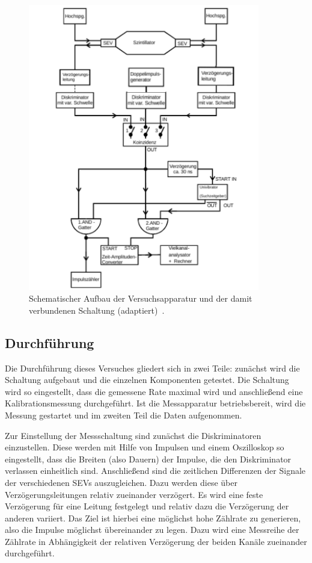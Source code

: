 \begin{figure}[htb]
  \centering
  \includegraphics[width=0.9\textwidth]{figures/versuchsaufbau_adapt.pdf}
  \caption{Schematischer Aufbau der Versuchsapparatur und der damit verbundenen Schaltung (adaptiert)~\cite{V01}.}
  \label{fig:aufbau}
\end{figure}

\subsection{Durchführung}

Die Durchführung dieses Versuches gliedert sich in zwei Teile: zunächst wird die
Schaltung aufgebaut und die einzelnen Komponenten getestet. Die Schaltung wird
so eingestellt, dass die gemessene Rate maximal wird und anschließend eine
Kalibrationsmessung durchgeführt. Ist die Messapparatur betriebsbereit, wird die
Messung gestartet und im zweiten Teil die Daten aufgenommen.

Zur Einstellung der Messschaltung sind zunächst die Diskriminatoren
einzustellen. Diese werden mit Hilfe von Impulsen und einem Oszilloskop so
eingestellt, dass die Breiten (also Dauern) der Impulse, die den Diskriminator
verlassen einheitlich sind. Anschließend sind die zeitlichen Differenzen der
Signale der verschiedenen SEVs auszugleichen. Dazu werden diese über
Verzögerungsleitungen relativ zueinander verzögert. Es wird eine feste
Verzögerung für eine Leitung festgelegt und relativ dazu die Verzögerung der
anderen variiert. Das Ziel ist hierbei eine möglichst hohe Zählrate zu
generieren, also die Impulse möglichst übereinander zu legen. Dazu wird eine
Messreihe der Zählrate in Abhängigkeit der relativen Verzögerung der beiden
Kanäle zueinander durchgeführt.

